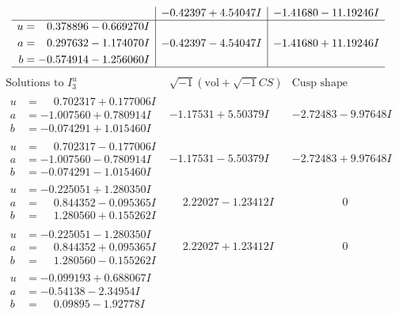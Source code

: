 \documentclass[1p]{elsarticle_modified}
\theoremstyle{definition}
\newcommand{\I}{\sqrt{-1}}
\begin{document}
$$\begin{array}{c|c|c}
 & -0.42397 + 4.54047 I & -1.41680 - 11.19246 I \\ \hline\begin{aligned}
u &= \phantom{-}0.378896 - 0.669270 I \\
a &= \phantom{-}0.297632 - 1.174070 I \\
b &= -0.574914 - 1.256060 I\end{aligned}
 & -0.42397 - 4.54047 I & -1.41680 + 11.19246 I\\
 \hline 
 \end{array}$$\newpage$$\begin{array}{c|c|c}  
\text{Solutions to }I^u_{3}& \I (\text{vol} + \sqrt{-1}CS) & \text{Cusp shape}\\
 \hline 
\begin{aligned}
u &= \phantom{-}0.702317 + 0.177006 I \\
a &= -1.007560 + 0.780914 I \\
b &= -0.074291 + 1.015460 I\end{aligned}
 & -1.17531 + 5.50379 I & -2.72483 - 9.97648 I \\ \hline\begin{aligned}
u &= \phantom{-}0.702317 - 0.177006 I \\
a &= -1.007560 - 0.780914 I \\
b &= -0.074291 - 1.015460 I\end{aligned}
 & -1.17531 - 5.50379 I & -2.72483 + 9.97648 I \\ \hline\begin{aligned}
u &= -0.225051 + 1.280350 I \\
a &= \phantom{-}0.844352 - 0.095365 I \\
b &= \phantom{-}1.280560 + 0.155262 I\end{aligned}
 & \phantom{-}2.22027 - 1.23412 I & \phantom{-0.000000 } 0 \\ \hline\begin{aligned}
u &= -0.225051 - 1.280350 I \\
a &= \phantom{-}0.844352 + 0.095365 I \\
b &= \phantom{-}1.280560 - 0.155262 I\end{aligned}
 & \phantom{-}2.22027 + 1.23412 I & \phantom{-0.000000 } 0 \\ \hline\begin{aligned}
u &= -0.099193 + 0.688067 I \\
a &= -0.54138 - 2.34954 I \\
b &= \phantom{-}0.09895 - 1.92778 I\end{aligned}

\end{array}$$
\end{document}
